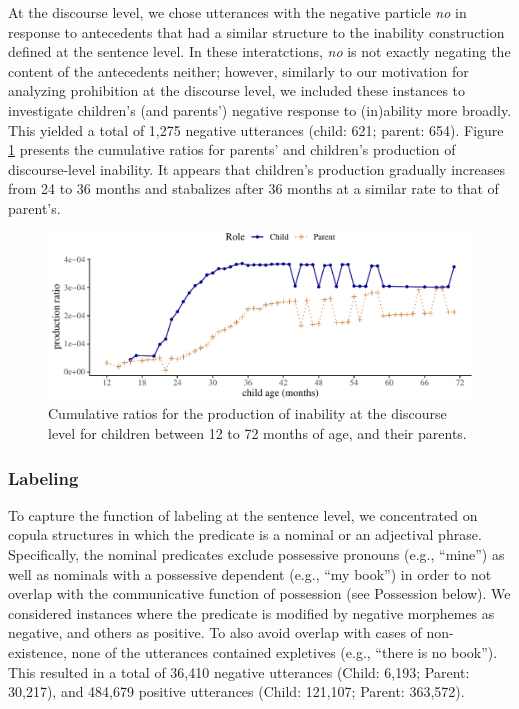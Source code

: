 \documentclass[
  english,
  man,floatsintext]{apa6}
\begin{document}
At the discourse level, we chose utterances with the negative particle \emph{no} in response to antecedents that had a similar structure to the inability construction defined at the sentence level. In these interatctions, \emph{no} is not exactly negating the content of the antecedents neither; however, similarly to our motivation for analyzing prohibition at the discourse level, we included these instances to investigate children's (and parents') negative response to (in)ability more broadly. This yielded a total of 1,275 negative utterances (child: 621; parent: 654). Figure \ref{fig:inabilitydiscourse} presents the cumulative ratios for parents' and children's production of discourse-level inability. It appears that children's production gradually increases from 24 to 36 months and stabalizes after 36 months at a similar rate to that of parent's.

\begin{figure}[H]

{\centering \includegraphics{neg_construction_article_files/figure-latex/inabilitydiscourse-1} 

}

\caption{Cumulative ratios for the production of inability at the discourse level for children between 12 to 72 months of age, and their parents.}\label{fig:inabilitydiscourse}
\end{figure}

\hypertarget{labeling}{%
\subsubsection{Labeling}\label{labeling}}

To capture the function of labeling at the sentence level, we concentrated on copula structures in which the predicate is a nominal or an adjectival phrase. Specifically, the nominal predicates exclude possessive pronouns (e.g., ``mine'') as well as nominals with a possessive dependent (e.g., ``my book'') in order to not overlap with the communicative function of possession (see Possession below). We considered instances where the predicate is modified by negative morphemes as negative, and others as positive. To also avoid overlap with cases of non-existence, none of the utterances contained expletives (e.g., ``there is no book''). This resulted in a total of 36,410 negative utterances (Child: 6,193; Parent: 30,217), and 484,679 positive utterances (Child: 121,107; Parent: 363,572).
\end{document}
